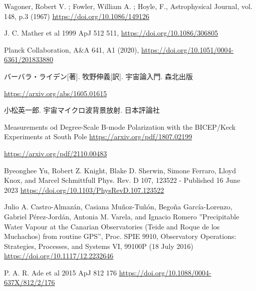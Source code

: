 \begin{thebibliography}{99}

Wagoner, Robert V. ; Fowler, William A. ; Hoyle, F., Astrophysical Journal, vol. 148, p.3 (1967)
\href{https://doi.org/10.1086/149126}{https://doi.org/10.1086/149126}

J. C. Mather et al 1999 ApJ 512 511,
\href{https://doi.org/10.1086/306805}{https://doi.org/10.1086/306805}

Planck Collaboration, A$\&$A 641, A1 (2020),
\href{https://doi.org/10.1051/0004-6361/201833880}{https://doi.org/10.1051/0004-6361/201833880}

バーバラ・ライデン[著]. 牧野伸義[訳]. 宇宙論入門. 森北出版

\href{https://arxiv.org/abs/1605.01615}{https://arxiv.org/abs/1605.01615}

小松英一郎. 宇宙マイクロ波背景放射. 日本評論社

Measurements od Degree-Scale B-mode Polarization with the BICEP/Keck Experiments at South Pole
\href{https://arxiv.org/pdf/1807.02199}{https://arxiv.org/pdf/1807.02199}

\href{https://arxiv.org/pdf/2110.00483}{https://arxiv.org/pdf/2110.00483}

Byeonghee Yu, Robert Z. Knight, Blake D. Sherwin, Simone Ferraro, Lloyd Knox, and Marcel Schmittfull Phys. Rev. D 107, 123522 - Published 16 June 2023
\href{https://doi.org/10.1103/PhysRevD.107.123522}{https://doi.org/10.1103/PhysRevD.107.123522}

Julio A. Castro-Almaz\'{a}n, Casiana Mu\~{n}oz-Tu\~{n}\'{o}n, Bego\~{n}a Garc\'{i}a-Lorenzo, Gabriel P\'{e}rez-Jord\'{a}n, Antonia M. Varela, and Ignacio Romero ”Precipitable Water Vapour at the Canarian Observatories (Teide and Roque de los Muchachos) from routine GPS”, Proc. SPIE 9910, Observatory Operations: Strategies, Processes, and Systems VI, 99100P (18 July 2016)
\href{https://doi.org/10.1117/12.2232646}{https://doi.org/10.1117/12.2232646}

P. A. R. Ade et al 2015 ApJ 812 176
\href{https://doi.org/10.1088/0004-637X/812/2/176}{https://doi.org/10.1088/0004-637X/812/2/176}


\end{thebibliography}
